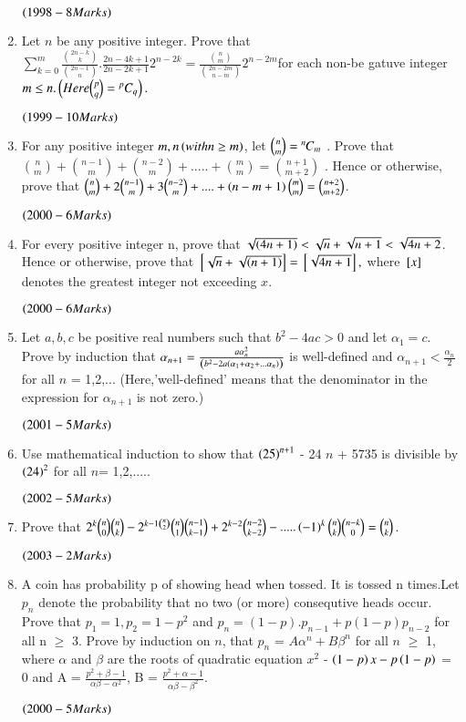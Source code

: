 \documentclass[journal,12pt,twocolumn]{IEEEtran}
\theoremstyle{remark}
\begin{document}
\begin{enumerate}[start=16]
$\hfill\textcolor{black}{\brak{1998-8 Marks} }$
\item 
Let $n$ be any positive integer. Prove that $\sum\limits^{m}_{k=0}\frac{\binom{2n-k}{k}}{\binom{2n-1}{n}}.\frac{2n-4k+1}{2n-2k+1}2^{n-2k}= \frac{\binom{n}{m}}{\binom{2n-2m}{n-m} } 2^{n-2m}$for each non-be gatuve integer $m\leq n. \left(Here \binom{p}{q} = {}^pC_q\right).$

$\hfill\textcolor{black}{\brak{1999-10 Marks} }$
\item
For any positive integer $m,n\left(with n \geq m\right)$, let $\binom{n}{m} ={{}^{n}\mkern-1muC_{m}}$ . Prove that $\binom{n}{m} + \binom{n-1}{m} + \binom{n-2}{m} + ..... + \binom{m}{m} = \binom{n+1}{m+2}$ . Hence or otherwise, prove that $\binom{n}{m} +2\binom{n-1}{m} +3\binom{n-2}{m}+....+ \left(n-m+1\right) \binom{m}{m} = \binom{n+2}{m+2}$.

$\hfill\textcolor{black}{\brak{2000-6 Marks} }$
\item
For every positive integer n, prove that $\sqrt{\left(4n+1\right)} < \sqrt{n} +\sqrt{n+1} < \sqrt{4n+2}$. Hence or otherwise, prove that ${}\left[\sqrt{n} + \sqrt{\left(n+1\right)}\right]= {}\left[\sqrt{4n+1}\right],$ where ${}\left[x\right]$ denotes the greatest integer not exceeding $x$.

$\hfill\textcolor{black}{\brak{2000-6 Marks} }$
\item
Let $a,b,c$ be positive real numbers such that $b^2 - 4ac > 0$ and let $\alpha_1 = c$. Prove by induction that $\alpha_{n+1} = \frac{a \alpha_{n}^2}{\left(b^2 - 2a \left(\alpha_1 + \alpha_2 + ... \alpha_n\right)\right)}$ is well-defined and $\alpha_{n+1} < \frac{\alpha_n}{2}$ for all $n$ = 1,2,...
		(Here,'well-defined' means that the denominator in the expression for $\alpha_{n+1}$ is not zero.)

$\hfill\textcolor{black}{\brak{2001-5 Marks} }$
\item
Use mathematical induction to show that $\left(25\right)^{n+1}$ - 24 $n$ + 5735 is divisible by $\left(24\right)^2$ for all $n$= 1,2,.....

$\hfill\textcolor{black}{\brak{2002-5 Marks} }$
\item 
Prove that $2^k \binom{n}{0}\binom{n}{k} - 2^{k-1\binom{n}{2}} \binom{n}{1} \binom{n-1}{k-1} + 2^{k-2}\binom{n-2}{k-2} - .....\left(-1\right)^k \binom{n}{k}\binom{n-k}{0} = \binom{n}{k}$.

$\hfill\textcolor{black}{\brak{2003-2 Marks} }$\item
A coin has probability p of showing head when tossed. It is tossed n times.Let $p_n$ denote the probability that no two (or more) consequtive heads occur. Prove that $p_1=1 , p_2=1-p^2$ and $p_n = (1-p).p_{n-1} + p(1-p)p_{n-2}$ for all n $\geq$ 3. Prove by induction on $n$, that $p_n$ = $A\alpha^n + B\beta^n$ for all $n$ $\geq$ 1, where $\alpha$ and $\beta$ are the roots of quadratic equation $x^2$ - $\left(1-p\right)x - p\left(1-p\right)$ = 0 and A = $\frac{p^2 + \beta -1}{\alpha\beta-\alpha^2}$, B = $\frac{p^2 + \alpha -1}{\alpha\beta - \beta^2}$.

$\hfill\textcolor{black}{\brak{2000-5 Marks} }$



\end{enumerate}
\end{document}

